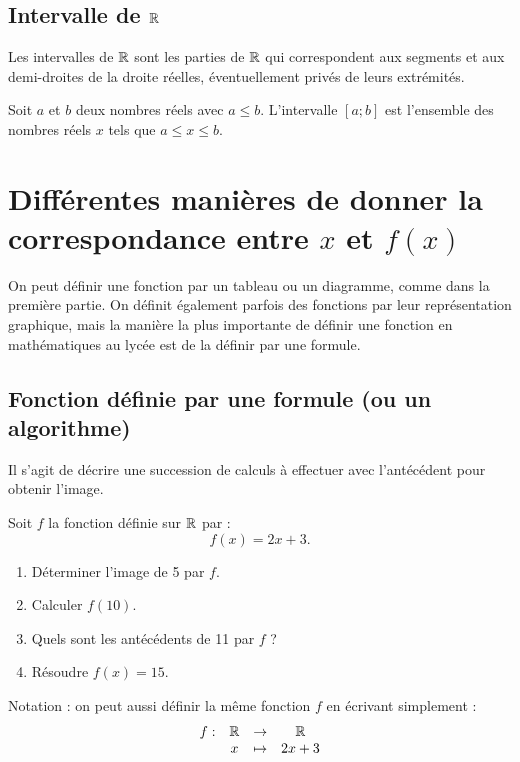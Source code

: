 \documentclass[a4paper,11pt,DIV18,BCOR0mm]{scrartcl}
\begin{document}
\subsection{Intervalle de $\mathbb{R}$}
Les intervalles de $\mathbb{R}$ sont les parties de
$\mathbb{R}$ qui correspondent
aux segments et aux demi-droites de la droite réelles,
éventuellement privés de leurs extrémités.
\begin{exemple}

\end{exemple}

\begin{definition}
Soit $a$ et $b$ deux nombres réels avec $a\leq b$.
L'intervalle $[a;b]$ est l'ensemble des nombres réels $x$
tels que $a\leq x\leq b$.
\end{definition}




\pagebreak
\section{Différentes manières de donner la correspondance entre $x$ et $f(x)$}
On peut définir une fonction par un tableau ou un diagramme, comme dans la première partie.
On définit également parfois des fonctions par leur représentation graphique, mais la manière la plus importante 
de définir une fonction
en mathématiques au lycée est de la définir par une formule.

\subsection{Fonction définie par une formule (ou un algorithme)}
Il s'agit de décrire une succession de calculs à effectuer avec l'antécédent 
pour obtenir l'image.
\begin{exemple}
 Soit $f$ la fonction définie sur $\mathbb{R}$ par :
\[
 f(x)=2x+3.
\]
\begin{enumerate}
 \item Déterminer l'image de 5 par $f$.
 \item Calculer $f(10)$.
 \item Quels sont les antécédents de 11 par $f$ ?
 \item Résoudre $f(x)=15$.
\end{enumerate}
\end{exemple}
Notation : on peut aussi définir la même fonction $f$ en écrivant simplement : 
\[
 \begin{array}{cccc}
  f:&\mathbb{R}&\rightarrow&\mathbb{R}\\
    &x&\mapsto&2x+3
 \end{array}
\]
\end{document}

